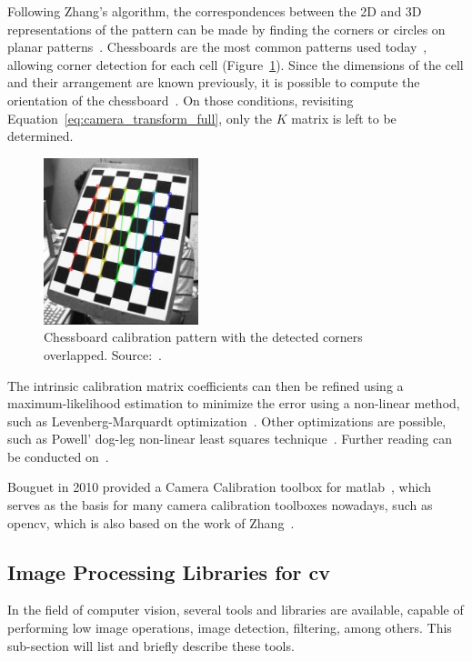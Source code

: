 Following Zhang's algorithm, the correspondences between the 2D and 3D representations of the pattern can be made by finding the corners or circles on planar patterns~\cite{opencv, mvg_book}. Chessboards are the most common patterns used today~\cite{opencv}, allowing corner detection for each cell (Figure~\ref{fig:opencv_calib_pattern}). Since the dimensions of the cell and their arrangement are known previously, it is possible to compute the orientation of the chessboard~\cite{Zhang2000, opencv_doc, mvg_book}. On those conditions, revisiting Equation~\eqref{eq:camera_transform_full}, only the $K$ matrix is left to be determined. 

\begin{figure}[!ht]
	\centering
	\includegraphics[width=0.4\textwidth, keepaspectratio]{img/camera/calib_pattern.jpg}
	\caption[Chessboard calibration pattern with the corners used for calibration.]{Chessboard calibration pattern with the detected corners overlapped. Source:~\cite{OpenCV_camera_calib}.}
	\label{fig:opencv_calib_pattern}
\end{figure}

The intrinsic calibration matrix coefficients can then be refined using a maximum-likelihood estimation to minimize the error using a non-linear method, such as Levenberg-Marquardt optimization~\cite{Levenberg1943}. Other optimizations are possible, such as Powell’ dog-leg non-linear least squares technique~\cite{Lourakis2005}. Further reading can be conducted on~\cite{mvg_book, Sturm2010, camera_models, Hata, Xu1996a}.

Bouguet in 2010 provided a Camera Calibration toolbox for \ac{matlab}~\cite{Bouguet2010}, which serves as the basis for many camera calibration toolboxes nowadays, such as \ac{opencv}, which is also based on the work of Zhang~\cite{opencv}.

\subsection{Image Processing Libraries for \acl{cv}}
In the field of computer vision, several tools and libraries are available, capable of performing low image operations, image detection, filtering, among others. This sub-section will list and briefly describe these tools.

